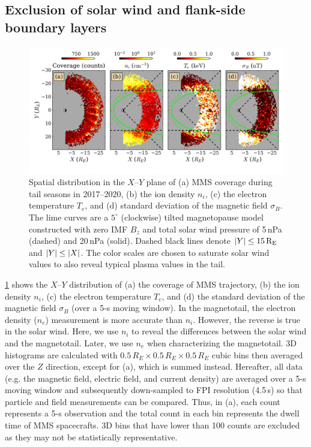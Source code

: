 \documentclass[draft]{agujournal2019}
\begin{document}
\subsection{Exclusion of solar wind and flank-side boundary layers}\label{sec:define_roi}

\begin{figure}
\centering
\noindent\includegraphics[width=\textwidth]{2023JA031358R-f02.pdf}
\caption{
Spatial distribution in the $X$--$Y$ plane of (a) MMS coverage during tail seasons in 2017--2020, (b) the ion density $n_i$, (c) the electron temperature $T_e$, and (d) standard deviation of the magnetic field $\sigma_B$. The lime curves are a $5^\circ$ (clockwise) tilted magnetopause model \cite{Lin2010} constructed with zero IMF $B_z$ and total solar wind pressure of 5\,\si{nPa} (dashed) and 20\,\si{nPa} (solid). Dashed black lines denote ${\abs{Y}\leq 15\,\si{R_E}}$ and ${\abs{Y}\leq\abs{X}}$. The color scales are chosen to saturate solar wind values to also reveal typical plasma values in the tail.
}
\label{fig:inner_tail}
\end{figure}

\cref{fig:inner_tail} shows the $X$--$Y$ distribution of (a) the coverage of MMS trajectory, (b) the ion density $n_i$, (c) the electron temperature $T_e$, and (d) the standard deviation of the magnetic field $\sigma_B$ (over a 5-s moving window). In the magnetotail, the electron density ($n_e$) measurement is more accurate than $n_i$. However, the reverse is true in the solar wind. Here, we use $n_i$ to reveal the differences between the solar wind and the magnetotail. Later, we use $n_e$ when characterizing the magnetotail. 3D histograms are calculated with ${0.5\,\si{R_E}\times0.5\,\si{R_E}\times0.5\,\si{R_E}}$ cubic bins then averaged over the $Z$ direction, except for (a), which is summed instead. Hereafter, all data (e.g. the magnetic field, electric field, and current density) are averaged over a 5-s moving window and subsequently down-sampled to FPI resolution (4.5\,\si{s}) so that particle and field measurements can be compared. Thus, in (a), each count represents a 5-s observation and the total count in each bin represents the dwell time of MMS spacecrafts. 3D bins that have lower than 100 counts are excluded as they may not be statistically representative.
\end{document}
